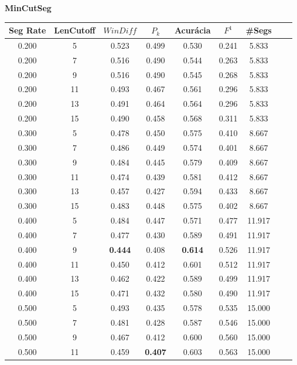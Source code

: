 \center
\textbf{MinCutSeg}  
\begin{longtable}[c]{|c|c|c|c|c|c|c|c|c|} 
\hline 
 Seg Rate & LenCutoff & $WinDiff$ & $P_k$ & Acurácia & $F^1$ & \#Segs\\ \hline 
 0.200 & 5 & 0.523 & 0.499 & 0.530 & 0.241 & 5.833  \\ \hline 
 0.200 & 7 & 0.516 & 0.490 & 0.544 & 0.263 & 5.833  \\ \hline 
 0.200 & 9 & 0.516 & 0.490 & 0.545 & 0.268 & 5.833  \\ \hline 
 0.200 & 11 & 0.493 & 0.467 & 0.561 & 0.296 & 5.833  \\ \hline 
 0.200 & 13 & 0.491 & 0.464 & 0.564 & 0.296 & 5.833  \\ \hline 
 0.200 & 15 & 0.490 & 0.458 & 0.568 & 0.311 & 5.833  \\ \hline 
 0.300 & 5 & 0.478 & 0.450 & 0.575 & 0.410 & 8.667  \\ \hline 
 0.300 & 7 & 0.486 & 0.449 & 0.574 & 0.401 & 8.667  \\ \hline 
 0.300 & 9 & 0.484 & 0.445 & 0.579 & 0.409 & 8.667  \\ \hline 
 0.300 & 11 & 0.474 & 0.439 & 0.581 & 0.412 & 8.667  \\ \hline 
 0.300 & 13 & 0.457 & 0.427 & 0.594 & 0.433 & 8.667  \\ \hline 
 0.300 & 15 & 0.483 & 0.448 & 0.575 & 0.402 & 8.667  \\ \hline 
 0.400 & 5 & 0.484 & 0.447 & 0.571 & 0.477 & 11.917  \\ \hline 
 0.400 & 7 & 0.477 & 0.430 & 0.589 & 0.491 & 11.917  \\ \hline 
 0.400 & 9 & \cellcolor{gray!20} \textbf{0.444} & 0.408 & \cellcolor{gray!20} \textbf{0.614} & 0.526 & 11.917  \\ \hline 
 0.400 & 11 & 0.450 & 0.412 & 0.601 & 0.512 & 11.917  \\ \hline 
 0.400 & 13 & 0.462 & 0.422 & 0.589 & 0.499 & 11.917  \\ \hline 
 0.400 & 15 & 0.471 & 0.432 & 0.580 & 0.490 & 11.917  \\ \hline 
 0.500 & 5 & 0.493 & 0.435 & 0.578 & 0.535 & 15.000  \\ \hline 
 0.500 & 7 & 0.481 & 0.428 & 0.587 & 0.546 & 15.000  \\ \hline 
 0.500 & 9 & 0.467 & 0.412 & 0.600 & 0.560 & 15.000  \\ \hline 
 0.500 & 11 & 0.459 & \cellcolor{gray!20} \textbf{0.407} & 0.603 & 0.563 & 15.000  \\ \hline 

\end{longtable}
